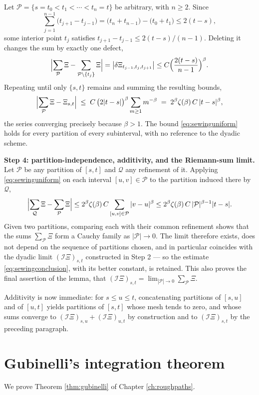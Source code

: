 Let $\mathcal{P} = \{s = t_0 < t_1 < \cdots < t_n = t\}$ be arbitrary, with $n\geq2$. Since
\[
\sum_{j=1}^{n-1}\bigl(t_{j+1}-t_{j-1}\bigr) = \bigl(t_n + t_{n-1}\bigr) - \bigl(t_0 + t_1\bigr) \leq 2(t-s),
\]
some interior point $t_j$ satisfies $t_{j+1}-t_{j-1} \leq 2(t-s)/(n-1)$. Deleting it changes the
sum by exactly one defect,
\[
\Bigl| \sum_{\mathcal{P}}\Xi - \sum_{\mathcal{P}\setminus\{t_j\}}\Xi \Bigr|
= \bigl|\delta \Xi_{t_{j-1},t_j,t_{j+1}}\bigr|
\leq C\Bigl(\frac{2(t-s)}{n-1}\Bigr)^{\beta}.
\]
Repeating until only $\{s,t\}$ remains and summing the resulting bounds,
\begin{equation}\label{eq:sewinguniform}
\Bigl| \sum_{\mathcal{P}}\Xi - \Xi_{s,t} \Bigr| \;\leq\; C\,\bigl(2|t-s|\bigr)^{\beta}\sum_{m\geq1} m^{-\beta}
\;=\; 2^{\beta}\zeta(\beta)\,C\,|t-s|^{\beta},
\end{equation}
the series converging precisely because $\beta>1$. The bound \eqref{eq:sewinguniform} holds for
every partition of every subinterval, with no reference to the dyadic scheme.

\medskip

\noindent\textbf{Step 4: partition-independence, additivity, and the Riemann-sum limit.} Let
$\mathcal{P}$ be any partition of $[s,t]$ and $\mathcal{Q}$ any refinement of it. Applying
\eqref{eq:sewinguniform} on each interval $[u,v]\in\mathcal{P}$ to the partition induced there by
$\mathcal{Q}$,
\[
\Bigl| \sum_{\mathcal{Q}}\Xi - \sum_{\mathcal{P}}\Xi \Bigr|
\leq 2^{\beta}\zeta(\beta)\,C \sum_{[u,v]\in\mathcal{P}} |v-u|^{\beta}
\leq 2^{\beta}\zeta(\beta)\,C\,|\mathcal{P}|^{\beta-1}|t-s| .
\]
Given two partitions, comparing each with their common refinement shows that the sums
$\sum_{\mathcal{P}}\Xi$ form a Cauchy family as $|\mathcal{P}|\to0$. The limit therefore exists,
does not depend on the sequence of partitions chosen, and in particular coincides with the dyadic
limit $(\mathcal{I}\Xi)_{s,t}$ constructed in Step 2 --- so the estimate
\eqref{eq:sewingconclusion}, with its better constant, is retained. This also proves the final
assertion of the lemma, that $(\mathcal{I}\Xi)_{s,t} = \lim_{|\mathcal{P}|\to0}\sum_{\mathcal{P}}\Xi$.

Additivity is now immediate: for $s\leq u\leq t$, concatenating partitions of $[s,u]$ and of
$[u,t]$ yields partitions of $[s,t]$ whose mesh tends to zero, and whose sums converge to
$(\mathcal{I}\Xi)_{s,u} + (\mathcal{I}\Xi)_{u,t}$ by construction and to $(\mathcal{I}\Xi)_{s,t}$ by
the preceding paragraph. \qedfilledtext


\section{Gubinelli's integration theorem}\label{app:proof:gubinelli}
We prove Theorem \ref{thm:gubinelli} of Chapter \ref{ch:roughpaths}.

